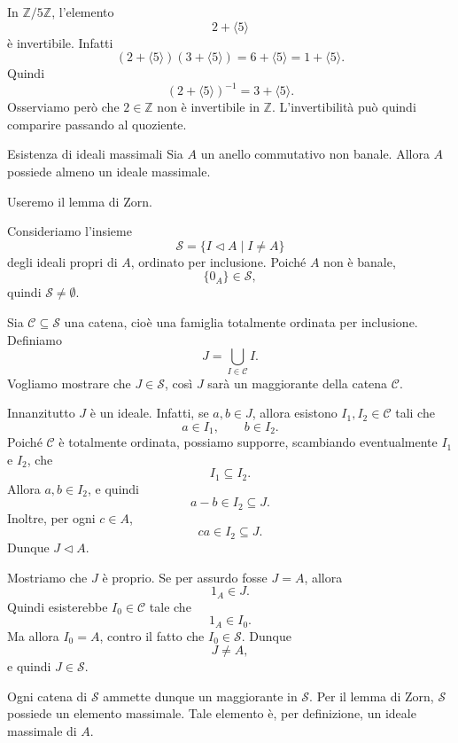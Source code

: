\documentclass[a4paper]{article}
\begin{document}
\begin{radioactive}
\begin{snippetexample}{}
    In \(\mathbb{Z}/5\mathbb{Z}\), l'elemento
    \[
        2+\langle 5 \rangle
    \]
    è invertibile. Infatti
    \[
        (2+\langle 5 \rangle)(3+\langle 5 \rangle)
        =
        6+\langle 5 \rangle
        =
        1+\langle 5 \rangle.
    \]
    Quindi
    \[
        (2+\langle 5 \rangle)^{-1}=3+\langle 5 \rangle.
    \]
    Osserviamo però che \(2\in\mathbb{Z}\) non è invertibile in \(\mathbb{Z}\). L'invertibilità può quindi comparire passando al quoziente.
\end{snippetexample}
\end{radioactive}

\begin{radioactive}
\begin{snippettheorem}{Esistenza di ideali massimali}
    Sia \(A\) un anello commutativo non banale. Allora \(A\) possiede almeno un ideale massimale.
\end{snippettheorem}
\end{radioactive}

\begin{radioactive}
\begin{snippetproof}{}
    Useremo il lemma di Zorn.

    Consideriamo l'insieme
    \[
        \mathcal{S}
        =
        \{I\triangleleft A\mid I\neq A\}
    \]
    degli ideali propri di \(A\), ordinato per inclusione. Poiché \(A\) non è banale,
    \[
        \{0_A\}\in \mathcal{S},
    \]
    quindi \(\mathcal{S}\neq\emptyset\).

    Sia \(\mathcal{C}\subseteq \mathcal{S}\) una catena, cioè una famiglia totalmente ordinata per inclusione. Definiamo
    \[
        J=\bigcup_{I\in\mathcal{C}} I.
    \]
    Vogliamo mostrare che \(J\in\mathcal{S}\), così \(J\) sarà un maggiorante della catena \(\mathcal{C}\).

    Innanzitutto \(J\) è un ideale. Infatti, se \(a,b\in J\), allora esistono \(I_1,I_2\in\mathcal{C}\) tali che
    \[
        a\in I_1,
        \qquad
        b\in I_2.
    \]
    Poiché \(\mathcal{C}\) è totalmente ordinata, possiamo supporre, scambiando eventualmente \(I_1\) e \(I_2\), che
    \[
        I_1\subseteq I_2.
    \]
    Allora \(a,b\in I_2\), e quindi
    \[
        a-b\in I_2\subseteq J.
    \]
    Inoltre, per ogni \(c\in A\),
    \[
        ca\in I_2\subseteq J.
    \]
    Dunque \(J\triangleleft A\).

    Mostriamo che \(J\) è proprio. Se per assurdo fosse \(J=A\), allora
    \[
        1_A\in J.
    \]
    Quindi esisterebbe \(I_0\in\mathcal{C}\) tale che
    \[
        1_A\in I_0.
    \]
    Ma allora \(I_0=A\), contro il fatto che \(I_0\in\mathcal{S}\).
    Dunque
    \[
        J\neq A,
    \]
    e quindi \(J\in\mathcal{S}\).

    Ogni catena di \(\mathcal{S}\) ammette dunque un maggiorante in \(\mathcal{S}\). Per il lemma di Zorn, \(\mathcal{S}\) possiede un elemento massimale.
    Tale elemento è, per definizione, un ideale massimale di \(A\).
\end{snippetproof}
\end{radioactive}
\end{document}
